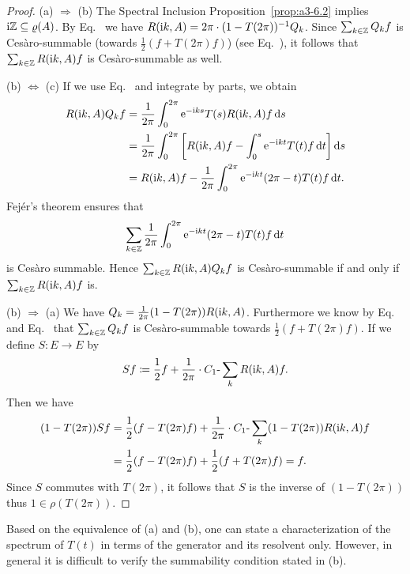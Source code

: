\begin{proof}
(a) $\Rightarrow$ (b) The Spectral Inclusion Proposition~\ref{prop:a3-6.2} implies $\im\Z \subseteq \rho(A)$.
By Eq.~ we have $R(\mathrm{i} k,A) = 2\pi\cdot(1-T(2\pi))^{-1}Q_{k}$.
Since $\sum_{k\in\mathbb{Z}} Q_{k}f$ is Cesàro-summable (\mbox{towards} $\frac{1}{2}(f + T(2\pi)f)$) (see Eq.~), it follows that $\sum_{k\in\mathbb{Z}} R(\mathrm{i} k,A)f$ is Cesàro-summable as well.

(b) $\Leftrightarrow$ (c) If we use Eq.~ and integrate by parts, we obtain
\begin{align*}
R(\mathrm{i} k,A)Q_{k}f &= \frac{1}{2\pi}\int_{0}^{2\pi} \mathrm{e}^{-\mathrm{i} ks} T(s)R(\mathrm{i} k,A)f \mathop{}\!\mathrm{d}{s} \\
&= \frac{1}{2\pi}\int_{0}^{2\pi} \left[R(\mathrm{i} k,A)f - \int_{0}^{s} \mathrm{e}^{-\mathrm{i} kt} T(t)f \mathop{}\!\mathrm{d}{t}\right] \mathop{}\!\mathrm{d}{s} \\
&= R(\mathrm{i} k,A)f - \frac{1}{2\pi}\int_{0}^{2\pi} \mathrm{e}^{-\mathrm{i} kt} (2\pi-t) T(t)f \mathop{}\!\mathrm{d}{t} .
\end{align*}
Fejér's theorem ensures that 
%
\[
	 \sum_{k\in\mathbb{Z}} \frac{1}{2\pi}\int_{0}^{2\pi} \mathrm{e}^{-\mathrm{i} kt} (2\pi-t) T(t)f \mathop{}\!\mathrm{d}{t} 
\]
%
is Cesàro summable.
Hence $\sum_{k\in\mathbb{Z}} R(\mathrm{i} k,A)Q_{k}f$ is Cesàro-summable if and only if\/ $\sum_{k\in\mathbb{Z}} R(\mathrm{i} k,A)f$ is.

(b) $\Rightarrow$ (a) We have $Q_{k} = \frac{1}{2\pi}(1 - T(2\pi))R(\mathrm{i} k,A)$.
Furthermore we know by Eq.~ and Eq.~  that $\sum_{k\in\mathbb{Z}} Q_{k}f$ is Cesàro-summable towards $\frac{1}{2}(f + T(2\pi)f)$.
If we define $S \colon E \to E$ by 
%
\[
	Sf \coloneq \frac{1}{2}f + \frac{1}{2\pi}\cdot C_{1}\text{-}\sum_k R(\mathrm{i} k,A)f .
\]
%
Then we have
\begin{align*}
(1 - T(2\pi))Sf &= \frac{1}{2}(f - T(2\pi)f) + \frac{1}{2\pi}\cdot C_{1}\text{-}\sum_k (1 - T(2\pi))R(\mathrm{i} k,A)f \\
&= \frac{1}{2}(f - T(2\pi)f) + \frac{1}{2}(f + T(2\pi)f) = f .
\end{align*}
Since $S$ commutes with $T(2\pi)$, it follows that $S$ is the inverse of\/ $(1 - T(2\pi))$ thus $1 \in \rho(T(2\pi))$.
\end{proof}
Based on the equivalence of (a) and (b), one can state a characterization of the spectrum of\/ $T(t)$ in terms of the generator and its resolvent only.
However, in general it is difficult to verify the summability condition stated in (b).

